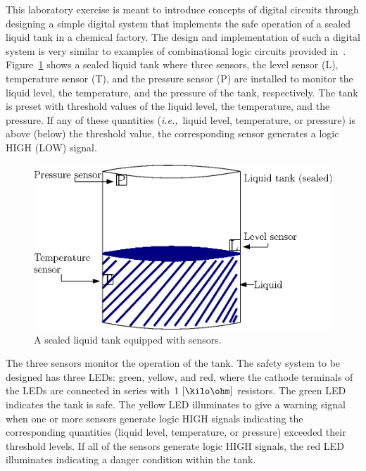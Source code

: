 This laboratory exercise is meant to introduce concepts of digital circuits through designing a simple digital system that implements the safe operation of a sealed liquid tank in a chemical factory. The design and implementation of such a digital system is very similar to examples of combinational logic circuits provided in~\cite[Ch.~3]{Dueck2005-Digital}. Figure~\ref{fig:liquidTank}  shows a sealed liquid tank where three sensors, the level sensor (L), temperature sensor (T), and the pressure sensor (P) are installed to monitor the liquid level, the temperature, and the pressure of the tank, respectively. The tank is preset with threshold values of the liquid level, the temperature, and the pressure. If any of these quantities (\textit{i.e.,}~liquid level, temperature, or pressure) is above (below) the threshold value, the corresponding sensor generates a logic HIGH (LOW) signal. %


\begin{figure}[h]
    \centering
    \includegraphics{figs/ipe/lab_10/liquidTank.eps}
    \caption{A sealed liquid tank equipped with sensors.}
    \label{fig:liquidTank}
\end{figure}


The three sensors monitor the operation of the tank. The safety system to be designed has three LEDs: green, yellow, and red, where the cathode terminals of the LEDs are connected in series with $1~[\kilo\ohm]$ resistors.  The green LED indicates the tank is safe. The yellow LED illuminates to give a warning signal when one or more sensors generate logic HIGH signals indicating the corresponding quantities (liquid level, temperature, or pressure)  exceeded their threshold levels. If all of the sensors generate logic HIGH signals, the red LED illuminates indicating  a  danger condition within the tank.

